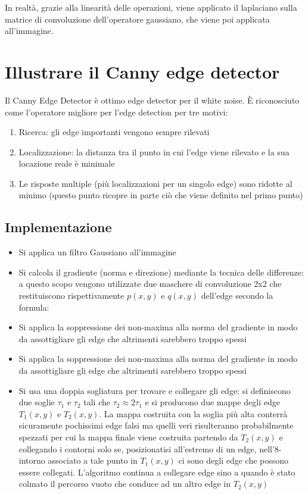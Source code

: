 In realtà, grazie alla linearità delle operazioni, viene applicato il laplaciano sulla matrice di convoluzione dell'operatore gaussiano, che viene poi applicata all'immagine.

\section{Illustrare il Canny edge detector}
Il Canny Edge Detector è ottimo edge detector per il white noise. È riconosciuto come l'operatore migliore per l'edge detection per tre motivi:
\begin{enumerate}
	\item Ricerca: gli edge importanti vengono sempre rilevati
	\item Localizzazione: la distanza tra il punto in cui l'edge viene rilevato e la sua locazione reale è minimale
	\item Le risposte multiple (più localizzazioni per un singolo edge) sono ridotte al minimo (questo punto ricopre in parte ciò che viene definito nel primo punto)
\end{enumerate}

\subsection{Implementazione}
\begin{itemize}
	\item Si applica un filtro Gaussiano all'immagine
	
	\item Si calcola il gradiente (norma e direzione) mediante la tecnica delle differenze: a questo scopo vengono utilizzate due maschere di convoluzione 2x2 che restituiscono rispettivamente $p(x,y)$ e $q(x,y)$ dell'edge secondo la formula:
	
	\item Si applica la soppressione dei non-maxima alla norma del gradiente in modo da assottigliare
	gli edge che altrimenti sarebbero troppo spessi
	
	
	\item Si applica la soppressione dei non-maxima alla norma del gradiente in modo da assottigliare gli edge che altrimenti sarebbero troppo spessi
	
	\item Si usa una doppia sogliatura per trovare e collegare gli edge: si definiscono due soglie $\tau_1$ e $\tau_2$ tali che $\tau_2 \approx 2 \tau_1$ e si producono due mappe degli edge $T_1(x,y)$ e $T_2(x,y)$. La mappa costruita con la soglia più alta conterrà sicuramente pochissimi edge falsi ma quelli veri risulteranno probabilmente spezzati per cui la mappa finale viene costruita partendo da $T_2(x,y)$ e collegando i contorni solo se, posizionatisi all'estremo di un edge, nell'8-intorno associato a	tale punto in $T_1(x,y)$ ci sono degli edge che possono essere collegati. L'algoritmo continua a collegare edge sino a quando è stato colmato il percorso vuoto che conduce ad un altro edge in $T_2(x,y)$
\end{itemize}

